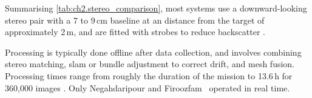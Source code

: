 Summarising \autoref{tab:ch2.stereo_comparison}, most systems use a downward-looking stereo pair with a 7 to 9\,cm baseline at an distance from the target of approximately 2\,m, 
and are fitted  with strobes to reduce backscatter 
\cite{johnson-robersonGenerationVisualizationLargescale2010,johnson-robersonHighResolutionUnderwaterRobotic2017}. 

Processing is typically done offline after data collection, and involves combining stereo matching, \gls{slam} or bundle adjustment to correct 
drift, and mesh fusion. Processing times range from roughly the duration of the mission 
\cite{johnson-robersonGenerationVisualizationLargescale2010} to 13.6\,h for 360{,}000 images 
\cite{johnson-robersonHighResolutionUnderwaterRobotic2017}. Only 
Negahdaripour and Firoozfam~\cite{negahdaripourROVStereovisionSystem2006} operated in real time.






